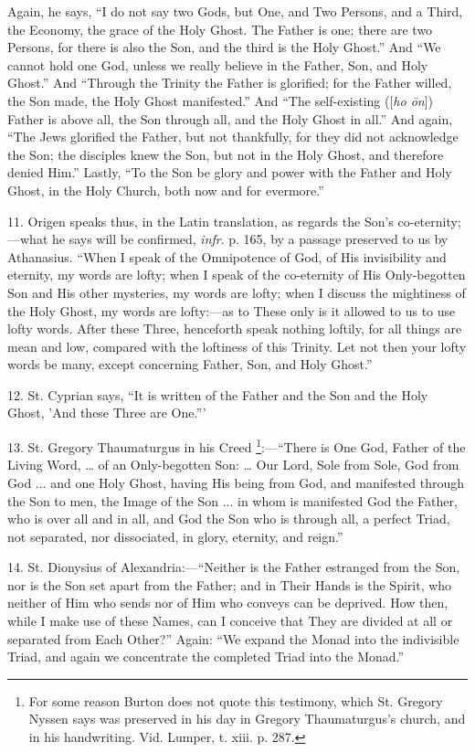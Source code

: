 Again, he says, ``I do not say two Gods, but One, and Two
Persons, and a Third, the Economy, the grace of the Holy Ghost. The
Father is one; there are two Persons, for there is also the Son, and
the third is the Holy Ghost.'' And ``We cannot hold one God,
unless we really believe in the Father, Son, and Holy Ghost.'' And
``Through the Trinity the Father is glorified; for the Father
willed, the Son made, the Holy Ghost manifested.'' And ``The
self-existing ([\emph{ho \={o}n}]) Father is above all, the Son
through all, and the Holy Ghost in all.'' And again, ``The
Jews glorified the Father, but not thankfully, for they did not
acknowledge the Son; the disciples knew the Son, but not in the
Holy Ghost, and therefore denied Him.'' Lastly, ``To the Son
be glory and power with the Father and Holy Ghost, in the Holy Church,
both now and for evermore.''

11. Origen speaks thus, in the Latin translation, as regards the
Son's co-eternity;—what he says will be confirmed, \emph{infr}. p.
165, by a passage preserved to us by Athanasius. ``When I speak of
the Omnipotence of God, of His invisibility and eternity, my words are
lofty; when I speak of the co-eternity of His Only-begotten Son and
His other mysteries, my words are lofty; when I discuss the mightiness
of the Holy Ghost, my words are lofty:—as to These only is it
allowed to us to use lofty words. After these Three, henceforth speak
nothing loftily, for all things are mean and low, compared with the
loftiness of this Trinity. Let not then your lofty words be many,
except concerning Father, Son, and Holy Ghost.''

12. St. Cyprian says, ``It is written of the Father and the Son
and the Holy Ghost, 'And these Three are One.'''

13. St. Gregory Thaumaturgus in his Creed \footnote{For some reason
Burton does not quote this testimony, which St. Gregory Nyssen says
was preserved in his day in Gregory Thaumaturgus's church, and in his
handwriting. Vid. Lumper, t. xiii. p. 287.}:—``There is One God, Father of the Living Word, … of an
Only-begotten Son: … Our Lord, Sole from Sole, God from God ... and
one Holy Ghost, having His being from God, and manifested through the
Son to men, the Image of the Son ... in whom is manifested God
the Father, who is over all and in all, and God the Son who is through
all, a perfect Triad, not separated, nor dissociated, in glory,
eternity, and reign.''

14. St. Dionysius of Alexandria:—``Neither is the Father
estranged from the Son, nor is the Son set apart from the Father; and
in Their Hands is the Spirit, who neither of Him who sends nor of Him
who conveys can be deprived. How then, while I make use of these
Names, can I conceive that They are divided at all or separated from
Each Other?'' Again: ``We expand the Monad into the
indivisible Triad, and again we concentrate the completed Triad into
the Monad.''

